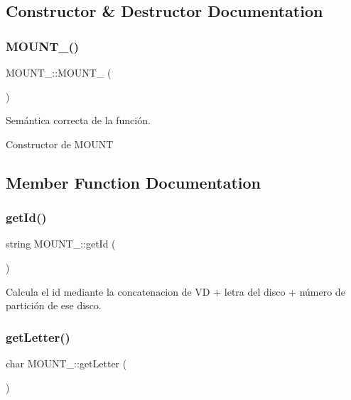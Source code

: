 \subsection{Constructor \& Destructor Documentation}
\mbox{\label{classMOUNT___ab2412abd1fe27e4c58bad1ec543c1bfd}} 
\subsubsection{\texorpdfstring{M\+O\+U\+N\+T\+\_\+()}{MOUNT\_()}}
{\footnotesize\ttfamily M\+O\+U\+N\+T\+\_\+\+::\+M\+O\+U\+N\+T\+\_\+ (\begin{DoxyParamCaption}{ }\end{DoxyParamCaption})\hspace{0.3cm}{\ttfamily [inline]}}



Semántica correcta de la función. 

Constructor de M\+O\+U\+NT 

\subsection{Member Function Documentation}
\mbox{\label{classMOUNT___ae42ec4c474c9fd74a25869cf13f9436a}} 
\subsubsection{\texorpdfstring{get\+Id()}{getId()}}
{\footnotesize\ttfamily string M\+O\+U\+N\+T\+\_\+\+::get\+Id (\begin{DoxyParamCaption}{ }\end{DoxyParamCaption})}

Calcula el id mediante la concatenacion de VD + letra del disco + número de partición de ese disco. \mbox{\label{classMOUNT___ac5af7651aa4eeede67b21c1c728bf898}} 
\subsubsection{\texorpdfstring{get\+Letter()}{getLetter()}}
{\footnotesize\ttfamily char M\+O\+U\+N\+T\+\_\+\+::get\+Letter (\begin{DoxyParamCaption}{ }\end{DoxyParamCaption})}

